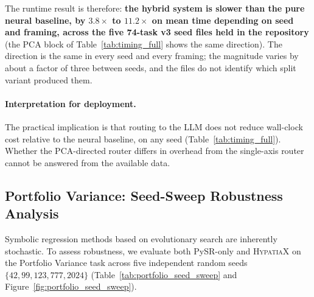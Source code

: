 \documentclass[twoside,11pt]{article}
\begin{document}
The runtime result is therefore: \textbf{the hybrid system
is slower than the pure neural baseline, by $3.8\times$ to $11.2\times$ on mean
time depending on seed and framing, across the five 74-task v3 seed files
held in the repository} (the PCA block of Table~\ref{tab:timing_full} shows the
same direction). The direction is the same in every seed and every
framing; the magnitude varies by about a factor of three between seeds, and
the files do not identify which split variant produced them.

\paragraph{Interpretation for deployment.}
The practical implication is that routing to the LLM does not reduce wall-clock cost relative to the neural baseline, on any seed (Table~\ref{tab:timing_full}). Whether the
PCA-directed router differs in overhead from the single-axis router cannot be
answered from the available data.


\subsection{Portfolio Variance: Seed-Sweep Robustness Analysis}\label{subsec:portfolio-variance-seedsweep-robustness-}
\label{sec:portfolio_seed_sweep}

Symbolic regression methods based on evolutionary search are inherently stochastic.
To assess robustness, we evaluate both PySR-only and \textsc{HypatiaX} on the
Portfolio Variance task across five independent random seeds
$\{42, 99, 123, 777, 2024\}$ (Table~\ref{tab:portfolio_seed_sweep} and
Figure~\ref{fig:portfolio_seed_sweep}).
\end{document}
